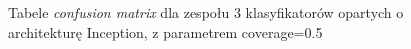 \documentclass[polish,12pt]{aghthesis}
\begin{document}
\begin{figure}[h!]%
    \begin{adjustbox}{minipage=1.0\paperwidth, pagecenter}
    \centering
    \qquad
    \end{adjustbox}
    \label{fig:inc-ens-3-0.5-matrices}
    \caption{Tabele \textit{confusion matrix} dla zespołu 3 klasyfikatorów opartych o architekturę Inception, z parametrem coverage=0.5}
\end{figure}
\end{document}

